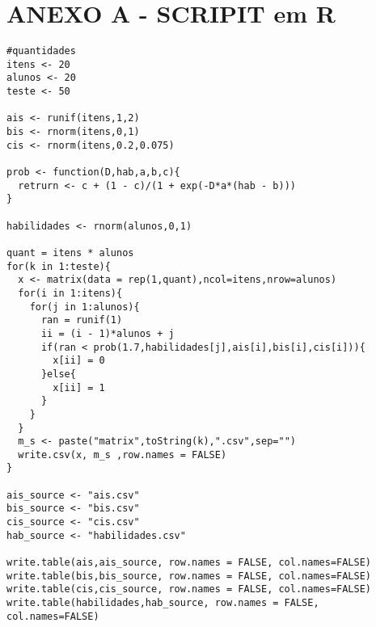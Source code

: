 	\section{ANEXO A - SCRIPIT em R}
\begin{verbatim}
#quantidades
itens <- 20
alunos <- 20
teste <- 50

ais <- runif(itens,1,2)
bis <- rnorm(itens,0,1)
cis <- rnorm(itens,0.2,0.075)

prob <- function(D,hab,a,b,c){
  retrurn <- c + (1 - c)/(1 + exp(-D*a*(hab - b)))
}

habilidades <- rnorm(alunos,0,1)

quant = itens * alunos
for(k in 1:teste){
  x <- matrix(data = rep(1,quant),ncol=itens,nrow=alunos)
  for(i in 1:itens){
    for(j in 1:alunos){
      ran = runif(1)
      ii = (i - 1)*alunos + j
      if(ran < prob(1.7,habilidades[j],ais[i],bis[i],cis[i])){
        x[ii] = 0
      }else{
        x[ii] = 1
      }
    }
  }
  m_s <- paste("matrix",toString(k),".csv",sep="")
  write.csv(x, m_s ,row.names = FALSE)
}

ais_source <- "ais.csv"
bis_source <- "bis.csv"
cis_source <- "cis.csv"
hab_source <- "habilidades.csv"

write.table(ais,ais_source, row.names = FALSE, col.names=FALSE)
write.table(bis,bis_source, row.names = FALSE, col.names=FALSE)
write.table(cis,cis_source, row.names = FALSE, col.names=FALSE)
write.table(habilidades,hab_source, row.names = FALSE, col.names=FALSE)


\end{verbatim}
